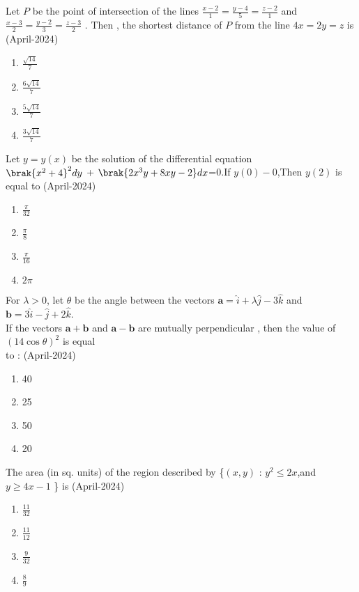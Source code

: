 \item Let $P$ be the point of intersection of the lines $\frac{x-2}{1}=\frac{y-4}{5}=\frac{z-2}{1}$ and $\frac{x-3}{2}=\frac{y-2}{3}=\frac{z-3}{2}$ . Then , the shortest distance of $P$ from the line $4x=2y=z$ is
\hfill{(April-2024)}
\begin{enumerate}
\item $\frac{\sqrt{14}}{7}$
\item  $\frac{6\sqrt{14}}{7}$
\item $\frac{5\sqrt{14}}{7}$
\item $\frac{3\sqrt{14}}{7}$
\end{enumerate}

\item Let $y=y(x)$ be the solution of the differential equation \\
$\brak{x^2+4}^2dy$ + $\brak{2x^3y+8xy-2}dx$=0.If $y(0)-0$,Then $y(2)$ is equal to 
\hfill{(April-2024)}
\begin{multicols}{2}
\begin{enumerate}
\item $\frac{\pi}{32}$
\item $\frac{\pi}{8}$
\item $\frac{\pi}{16}$
\item $2\pi$
\end{enumerate}
\end{multicols}
\item For $\lambda > 0$, let $\theta$ be the angle between the vectors $\mathbf{a} = \hat{i} + \lambda \hat{j} - 3 \hat{k}$ and $\mathbf{b} = 3 \hat{i} - \hat{j} + 2 \hat{k}$. \\
If the vectors $\mathbf{a} + \mathbf{b}$ and $\mathbf{a} - \mathbf{b}$ are mutually perpendicular , then the value of $(14\cos{\theta})^2$ is equal \\to :     
\hfill{(April-2024)}
\begin{multicols}{2}
\begin{enumerate}
\item 40
\item 25
\item 50
\item 20
\end{enumerate}
\end{multicols}
\item The area (in sq. units) of the region described by \{$(x, y)$ : $y^2 \leq 2x$,and $y \geq 4x - 1$ \} is
\hfill{(April-2024)}
\begin{multicols}{2}
\begin{enumerate}
\item $\frac{11}{32}$
\item $\frac{11}{12}$
\item $\frac{9}{32}$
\item $\frac{8}{9}$
\end{enumerate}
\end{multicols}
